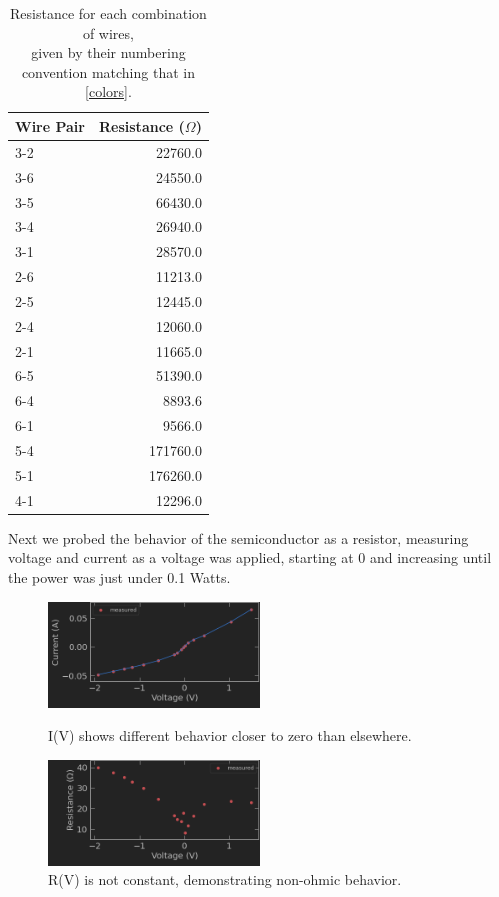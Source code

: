 \documentclass[aps,prl,reprint]{revtex4-2}
\begin{document}
\begin{table}[h]
\begin{tabular}{lr}
\toprule
Wire Pair &  Resistance ($\Omega$) \\
\midrule
\hline
3-2       &     22760.0 \\
3-6       &     24550.0 \\
3-5       &     66430.0 \\
3-4       &     26940.0 \\
3-1       &     28570.0 \\
2-6       &     11213.0 \\
2-5       &     12445.0 \\
2-4       &     12060.0 \\
2-1       &     11665.0 \\
6-5       &     51390.0 \\
6-4       &      8893.6 \\
6-1       &      9566.0 \\
5-4       &    171760.0 \\
5-1       &    176260.0 \\
4-1       &     12296.0 \\
\hline
\hline
\bottomrule
\end{tabular}
\caption{\label{pairs}Resistance for each combination of wires,\\ given by their numbering convention matching that in \ref{colors}.}
\end{table}

Next we probed the behavior of the semiconductor as a resistor, measuring voltage and current as
a voltage was applied, starting at 0 and increasing until the power was just under 0.1 Watts. 


\begin{figure}[h]
\includegraphics[width=0.5\textwidth]{../Images/l2_a_1.png}
\caption{\label{figA}I(V) shows different behavior closer to zero than elsewhere. }

\includegraphics[width=0.5\textwidth]{../Images/l2_a_2.png}
\caption{\label{figA}R(V) is not constant, demonstrating non-ohmic behavior.}
\end{figure}
\end{document}
